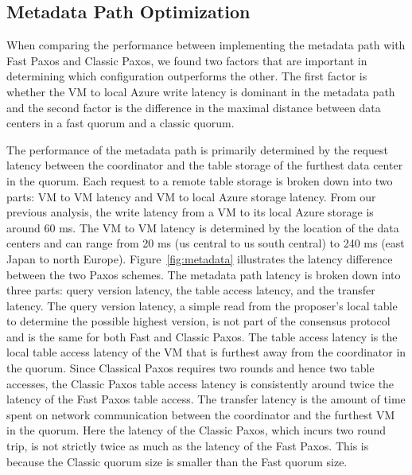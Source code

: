 

\subsection{Metadata Path Optimization}
When comparing the performance between implementing the metadata path with Fast Paxos and Classic Paxos, we found two factors that are important in determining which configuration outperforms the other.  The first factor is whether the VM to local Azure write latency is dominant in the metadata path and the second factor is the difference in the maximal distance between data centers in a fast quorum and a classic quorum. 

The performance of the metadata path is primarily determined by the request latency between the coordinator and the table storage of the furthest data center in the quorum. Each request to a remote table storage is broken down into two parts: VM to VM latency and VM to local Azure storage latency. From our previous analysis, the write latency from a VM to its local Azure storage is around 60 ms. The VM to VM latency is determined by the location of the data centers and can range from 20 ms (us central to us south central) to 240 ms (east Japan to north Europe). Figure~\ref{fig:metadata} illustrates the latency difference between the two Paxos schemes. The metadata path latency is broken down into three parts: query version latency, the table access latency, and the transfer latency. The query version latency, a simple read from the proposer’s local table to determine the possible highest version, is not part of the consensus protocol and is the same for both Fast and Classic Paxos. The table access latency is the local table access latency of the VM that is furthest away from the coordinator in the quorum. Since Classical Paxos requires two rounds and hence two table accesses, the Classic Paxos table access latency is consistently around twice the latency of the Fast Paxos table access. The transfer latency is the amount of time spent on network communication between the coordinator and the furthest VM in the quorum. Here the latency of the Classic Paxos, which incurs two round trip, is not strictly twice as much as the latency of the Fast Paxos. This is because the Classic quorum size is smaller than the Fast quorum size.

